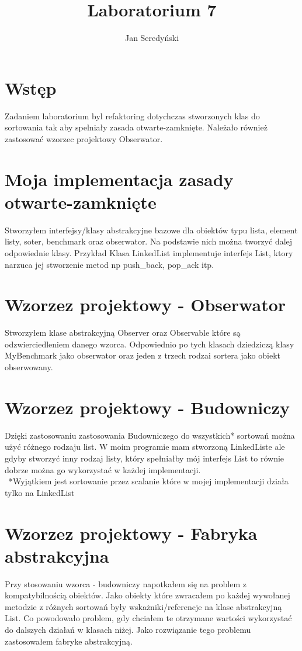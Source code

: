\documentclass[11pt]{article}
\begin{document}
\title{Laboratorium 7}
\author{Jan Seredyński}
\maketitle

\section{Wstęp}
Zadaniem laboratorium byl refaktoring dotychczas stworzonych klas do sortowania tak aby spelniały zasada otwarte-zamknięte. Należało również zastosować wzorzec projektowy Obserwator. 


\section{Moja implementacja zasady otwarte-zamknięte}
Stworzyłem interfejsy/klasy abstrakcyjne bazowe dla obiektów typu lista, element listy, soter, benchmark oraz obserwator. Na podstawie nich można tworzyć dalej odpowiednie klasy. 
Przykład
Klasa LinkedList implementuje interfejs List, ktory narzuca jej stworzenie
 metod np push\_back, pop\_ack itp.


\section{Wzorzez projektowy - Obserwator}
Stworzyłem klase abstrakcyjną Observer oraz Observable które są odzwierciedleniem danego wzorca. Odpowiednio po tych klasach dziedziczą klasy MyBenchmark jako obserwator oraz jeden z trzech rodzai sortera jako obiekt obserwowany.

\section{Wzorzez projektowy - Budowniczy}
Dzięki zastosowaniu zastosowania Budowniczego do wszystkich* sortowań można użyć różnego rodzaju list. W moim programie mam stworzoną LinkedListe ale gdyby stworzyć inny rodzaj listy, który spełniałby mój interfejs List to równie dobrze można go wykorzystać w każdej implementacji.\\\
*Wyjątkiem jest sortowanie przez scalanie które w mojej implementacji działa tylko na LinkedList

\section{Wzorzez projektowy - Fabryka abstrakcyjna}
Przy stosowaniu wzorca - budowniczy napotkałem się na problem z kompatybilnością obiektów. Jako obiekty które zwracałem po każdej wywołanej metodzie z różnych sortowań były wskażniki/referencje na klase abstrakcyjną List. Co powodowało problem, gdy chciałem te otrzymane wartości wykorzystać do dalszych działań w klasach niżej. Jako rozwiązanie tego problemu zastosowałem fabryke abstrakcyjną.
\end{document}
